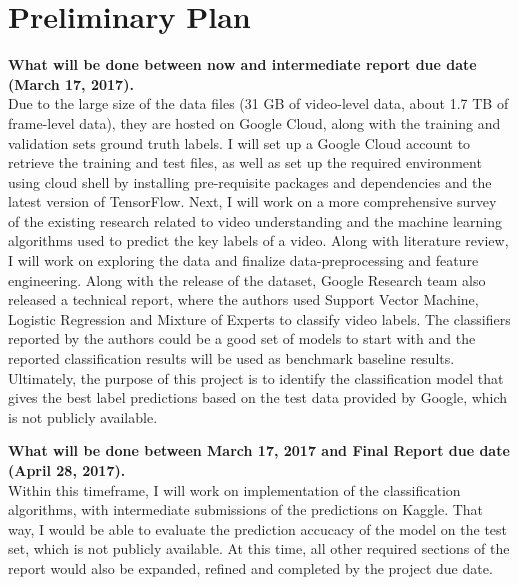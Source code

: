 \documentclass{sig-alternate-05-2015}
\begin{document}
\section{Preliminary Plan}
\textbf{What will be done between now and intermediate report due date (March 17, 2017).} \\
Due to the large size of the data files (31 GB of video-level data, about 1.7 TB of frame-level data), they are hosted on Google Cloud, along with the training and validation sets ground truth labels. I will set up a Google Cloud account to retrieve the training and test files, as well as set up the required environment using cloud shell by installing pre-requisite packages and dependencies and the latest version of TensorFlow. Next, I will work on a more comprehensive survey of the existing research related to video understanding and the machine learning algorithms used to predict the key labels of a video. Along with literature review, I will work on exploring the data and finalize data-preprocessing and feature engineering. Along with the release of the dataset, Google Research team also released a technical report\cite{4}, where the authors used Support Vector Machine, Logistic Regression and Mixture of Experts to classify video labels. The classifiers reported by the authors could be a good set of models to start with and the reported classification results will be used as benchmark baseline results. Ultimately, the purpose of this project is to identify the classification model that gives the best label predictions based on the test data provided by Google, which is not publicly available.

\textbf{What will be done between March 17, 2017 and Final Report due date (April 28, 2017).} \\
Within this timeframe, I will work on implementation of the classification algorithms, with intermediate submissions of the predictions on Kaggle. That way, I would be able to evaluate the prediction accucacy of the model on the test set, which is not publicly available. At this time, all other required sections of the report would also be expanded, refined and completed by the project due date. 

%

% 

%
%





\end{document}

